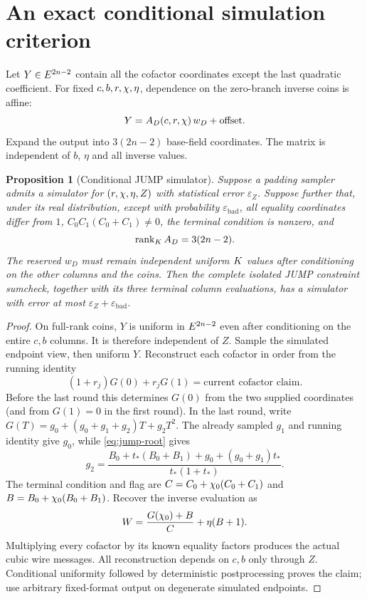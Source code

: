 \documentclass[11pt]{article}
\newtheorem{proposition}{Proposition}
\begin{document}
\section{An exact conditional simulation criterion}

Let $Y\in E^{2n-2}$ contain all the cofactor coordinates except the last quadratic coefficient. For fixed $c,b,r,\chi,\eta$, dependence on the zero-branch inverse coins is affine:
\[
 Y=A_D(c,r,\chi)\,w_D+\text{offset}.
\]
Expand the output into $3(2n-2)$ base-field coordinates. The matrix is independent of $b$, $\eta$ and all inverse values.

\begin{proposition}[Conditional JUMP simulator]\label{prop:jump-conditional}
Suppose a padding sampler admits a simulator for $(r,\chi,\eta,Z)$ with statistical error $\varepsilon_Z$. Suppose further that, under its real distribution, except with probability $\varepsilon_{\mathrm{bad}}$, all equality coordinates differ from $1$, $C_0C_1(C_0+C_1)\ne0$, the terminal condition is nonzero, and
\[
 \operatorname{rank}_{K} A_D=3(2n-2).
\]
The reserved $w_D$ must remain independent uniform $K$ values after conditioning on the other columns and the coins. Then the complete isolated JUMP constraint sumcheck, together with its three terminal column evaluations, has a simulator with error at most $\varepsilon_Z+\varepsilon_{\mathrm{bad}}$.
\end{proposition}
\begin{proof}
On full-rank coins, $Y$ is uniform in $E^{2n-2}$ even after conditioning on the entire $c,b$ columns. It is therefore independent of $Z$. Sample the simulated endpoint view, then uniform $Y$. Reconstruct each cofactor in order from the running identity
\[
 (1+r_j)G(0)+r_jG(1)=\text{current cofactor claim}.
\]
Before the last round this determines $G(0)$ from the two supplied coordinates (and from $G(1)=0$ in the first round). In the last round, write $G(T)=g_0+(g_0+g_1+g_2)T+g_2T^2$. The already sampled $g_1$ and running identity give $g_0$, while \eqref{eq:jump-root} gives
\[
 g_2=\frac{B_0+t_*(B_0+B_1)+g_0+(g_0+g_1)t_*}{t_*(1+t_*)}.
\]
The terminal condition and flag are $C=C_0+\chi_0(C_0+C_1)$ and $B=B_0+\chi_0(B_0+B_1)$. Recover the inverse evaluation as
\[
 W=\frac{G(\chi_0)+B}{C}+\eta(B+1).
\]
Multiplying every cofactor by its known equality factors produces the actual cubic wire messages. All reconstruction depends on $c,b$ only through $Z$. Conditional uniformity followed by deterministic postprocessing proves the claim; use arbitrary fixed-format output on degenerate simulated endpoints.
\end{proof}
\end{document}
